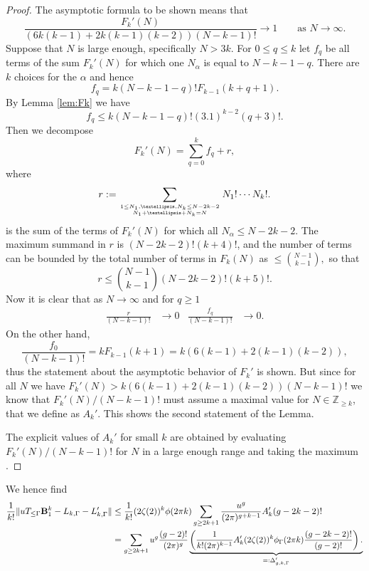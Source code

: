 \documentclass[12pt]{amsart}
\theoremstyle{definition}
\numberwithin{equation}{section}
\newcommand{\bB}{\mathbf{B}}
\newcommand{\numcheck}[1]{\cite[Computation #1]{SupplementaryNotebook}}
\theoremstyle{definition} %
\theoremstyle{remark}
\begin{document}
\begin{proof}
    The asymptotic formula to be shown means that 
    \[
        \frac{F_k'(N)}{(6k(k-1)+2k(k-1)(k-2)) (N-k-1)!} \to 1 \quad\quad\text{as $N\to \infty$}.
    \]
Suppose that $N$ is large enough, specifically $N>3k$. For $0\leq q\leq k$ let $f_q$ be all terms of the sum $F_k'(N)$ for which one $N_\alpha$ is equal to $N-k-1-q$. There are $k$ choices for the $\alpha$ and hence
\[
f_q = k (N-k-1-q)! F_{k-1}(k+q+1).
\]
By Lemma \ref{lem:Fk} we have 
\[
f_q \leq k (N-k-1-q)! (3.1)^{k-2} (q+3)!.
\]
Then we decompose
\[
    F_k'(N) = \sum_{q=0}^{k} f_q +r,
\] 
where 
\[
    r
    :=
    \sum_{1\leq N_1,\dots,N_k\leq N-2k-2\atop N_1+\dots+N_k=N}
    N_1!\cdots N_k!.
\] 
is the sum of the terms of $F_k'(N)$ for which all $N_\alpha\leq N-2k-2$.
The maximum summand in $r$ is $(N-2k-2)!(k+4)!$, and the number of terms can be bounded by the total number of terms in $F_k(N)$ as $
\leq \binom{N-1}{k-1},
$ 
so that 
\[
r\leq \binom{N-1}{k-1} (N-2k-2)!(k+5)!.
\]
Now it is clear that as $N\to \infty$ and for $q\geq 1$
\begin{align*}
\frac{r}{(N-k-1)!} &\to 0 
&
\frac{f_q}{(N-k-1)!} &\to 0 .
\end{align*}
On the other hand,
\[
    \frac{f_0}{(N-k-1)!}
    =k F_{k-1}(k+1)
    = k (6(k-1)+2(k-1)(k-2)),
\]
thus the statement about the asymptotic behavior of $F_k'$ is shown.
But since for all $N$ we have $F_k'(N)>k (6(k-1)+2(k-1)(k-2)) (N-k-1)!$ we know that $F_k'(N)/(N-k-1)!$ must assume a maximal value for $N\in \mathbb{Z}_{\geq k}$, that we define as $A_k'$. This shows the second statement of the Lemma.

The explicit values of $A_k'$ for small $k$ are obtained by evaluating $F_k'(N)/(N-k-1)!$ for $N$ in a large enough range and taking the maximum \numcheck{FKPRIME}.
\end{proof}

We hence find
\begin{align} \label{eq:otherterms}
    \frac{1}{k!}\|u T_{\leq \Gamma} \bB_1^k-L_{k,\Gamma}-L_{k,\Gamma}'\| &\leq
    \frac{1}{k!}
    (2\zeta(2))^k 
    \phi(2\pi k)
    \sum_{g\geq 2k+1}
    \frac{u^g}{(2\pi)^{g+k-1}}
    A_k'
    (g-2k-2)! \notag
    \\&=
    \scalebox{.95}{$\displaystyle{\sum_{g\geq 2k+1}
    u^g\frac{(g-2)!}{(2\pi)^{g}}
    \underbrace{
        \left(
    \frac{1}{k! (2\pi)^{k-1}}A_k'(2\zeta(2))^k 
    \phi_\Gamma(2\pi k)
    \frac{(g-2k-2)!}{(g-2)!}
    \right).
    }_{=:\Delta_{g,k,\Gamma}'}}$}
\end{align}
\end{document}
